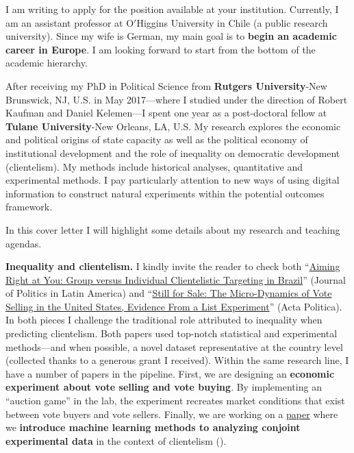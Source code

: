 \vspace{-0.3cm}I am writing to apply for the position available at your institution. Currently, I am an assistant professor at O$'$Higgins University in Chile (a public research university). Since my wife is German, my main goal is to {\bf begin an academic career in Europe}. I am looking forward to start from the bottom of the academic hierarchy. 

After receiving my PhD in Political Science from {\bf Rutgers University}-New Brunswick, NJ, U.S. in May 2017---where I studied under the direction of Robert Kaufman and Daniel Kelemen---I spent one year as a post-doctoral fellow at {\bf Tulane University}-New Orleans, LA, U.S. My research explores the economic and political origins of state capacity as well as the political economy of institutional development and the role of inequality on democratic development (clientelism). My methods include historical analyses, quantitative and experimental methods. I pay particularly attention to new ways of using digital information to construct natural experiments within the potential outcomes framework. 

In this cover letter I will highlight some details about my research and teaching agendas. 



{\bf Inequality and clientelism.} I kindly invite the reader to check both ``\href{https://journals.sub.uni-hamburg.de/giga/jpla/article/view/1121/1128}{Aiming Right at You: Group versus Individual Clientelistic Targeting in Brazil}'' (Journal of Politics in Latin America) and ``\href{https://doi.org/10.1057/s41269-020-00174-4}{Still for Sale: The Micro-Dynamics of Vote Selling in the United States, Evidence From a List Experiment}'' (Acta Politica). In both pieces I challenge the traditional role attributed to inequality when predicting clientelism. Both papers used top-notch statistical and experimental methods---and when possible, a novel dataset representative at the country level (collected thanks to a generous grant I received). Within the same research line, I have a number of papers in the pipeline. First, we are designing an {\bf economic experiment about vote selling and vote buying}. By implementing an ``auction game'' in the lab, the experiment recreates market conditions that exist between vote buyers and vote sellers. Finally, we are working on a \href{https://github.com/hbahamonde/Conjoint_US/raw/master/Bahamonde_Quininao_Conjoint.pdf}{paper} where we {\bf introduce machine learning methods to analyzing conjoint experimental data} in the context of clientelism (\emph{\unskip}).


